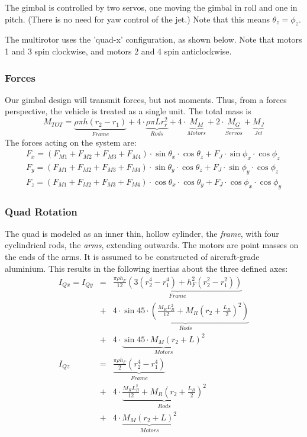 \documentclass[10pt]{article}
\begin{document}
The gimbal is controlled by two servos, one moving the gimbal in roll and one in pitch. (There is no need for yaw control of the jet.)  Note that this means $\theta_z = \phi_z$.

The multirotor uses the 'quad-x' configuration, as shown below. Note that motors 1 and 3 spin clockwise, and motors 2 and 4 spin anticlockwise.

\subsubsection{Forces}
Our gimbal design will transmit forces, but not moments. Thus, from a forces perspective, the vehicle is treated as a single unit. The total mass is
\begin{equation}
    M_{TOT} = \underbrace{\rho\pi h (r_2-r_1)}_{Frame} + 4\cdot\underbrace{\rho\pi L r_r^2}_{Rods} + 4\cdot\underbrace{M_M}_{Motors} + 2\cdot\underbrace{M_G}_{Servos} + \underbrace{M_J}_{Jet} \label{eqn:total_mass}
\end{equation}
The forces acting on the system are:
\begin{eqnarray}
    F_x = (F_{M1} + F_{M2} + F_{M3} + F_{M4})\cdot\sin{\theta_x}\cdot\cos{\theta_z} +  F_J\cdot\sin{\phi_x}\cdot\cos{\phi_z} \\
    F_y = (F_{M1} + F_{M2} + F_{M3} + F_{M4})\cdot\sin{\theta_y}\cdot\cos{\theta_z} +  F_J\cdot\sin{\phi_y}\cdot\cos{\phi_z} \\
    F_z = (F_{M1} + F_{M2} + F_{M3} + F_{M4})\cdot\cos{\theta_x}\cdot\cos{\theta_y} +  F_J\cdot\cos{\phi_x}\cdot\cos{\phi_y}
\end{eqnarray}

\subsubsection{Quad Rotation}
The quad is modeled as an inner thin, hollow cylinder, the \emph{frame}, with four cyclindrical rods, the \emph{arms}, extending outwards. The motors are point masses on the ends of the arms. It is assumed to be constructed of aircraft-grade aluminium. This results in the following inertias about the three defined axes:
\begin{eqnarray}
    I_{Qx} = I_{Qy} & = & \underbrace{\frac{\pi \rho h_F}{12}(3(r_2^4-r_1^4) + h_F^2(r_2^2-r_1^2))}_{Frame} \nonumber \\ & + & 4 \cdot \underbrace{\sin 45 \cdot (\frac{M_R L_R^2}{12}+M_R(r_2+\frac{L_R}{2})^2)}_{Rods} \nonumber \\ & + & 4 \cdot \underbrace{\sin 45 \cdot M_M(r_2+L)^2}_{Motors} \\
    I_{Qz} & = & \underbrace{\frac{\pi \rho h_F}{2}(r_2^4-r_1^4)}_{Frame} \nonumber \\ & + & 4 \cdot \underbrace{\frac{M_RL_R^2}{12} + M_R(r_2+\frac{L_R}{2})^2}_{Rods} \nonumber \\ & + & 4 \cdot \underbrace{M_M(r_2+L)^2}_{Motors}
\end{eqnarray}
\end{document}
